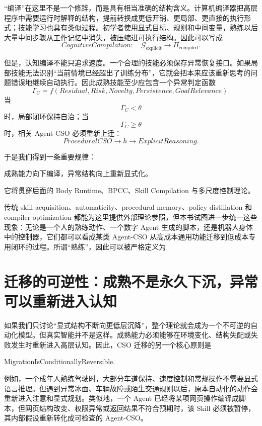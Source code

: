 “编译”在这里不是一个修辞，而是具有相当准确的结构含义。计算机编译器把高层程序中需要运行时解释的结构，提前转换成更低开销、更局部、更直接的执行形式；技能学习也具有类似过程。初学者使用显式目标、规则和中间变量，熟练以后大量中间步骤从工作记忆中消失，被压缩进可执行结构。因此可以写成
\[
CognitiveCompilation:
\quad
\mathcal G_{\mathrm{explicit}}
\rightarrow
\Pi_{\mathrm{compiled}}.
\]

但是，认知编译不能只追求速度。一个合理的技能必须保存异常恢复接口。如果局部技能无法识别“当前情境已经超出了训练分布”，它就会把本来应该重新思考的问题错误地继续自动执行。因此成熟技能至少应包含一个异常判定函数
\[
\Gamma_C
=
f(
Residual,
Risk,
Novelty,
Persistence,
GoalRelevance
).
\]
当
\[
\Gamma_C<\theta
\]
时，局部闭环保持自治；当
\[
\Gamma_C\geq\theta
\]
时，相关 Agent-CSO 必须重新上迁：
\[
ProceduralCSO
\rightarrow
h
\rightarrow
ExplicitReasoning.
\]

于是我们得到一条重要规律：
\begin{proposition*}
成熟能力向下编译，异常结构向上重新显式化。
\end{proposition*}
它将贯穿后面的 Body Runtime、BPCC、Skill Compilation 与多尺度控制理论。

传统 skill acquisition、automaticity、procedural memory、policy distillation 和 compiler optimization 都能为这里提供外部理论参照，但本书试图进一步统一这些现象：无论是一个人的熟练动作、一个数字 Agent 生成的脚本，还是机器人身体中的控制器，它们都可以看成某类 Agent-CSO 从高成本通用功能迁移到低成本专用闭环的过程。所谓“熟练”，因此可以被严格定义为
\begin{statementbox}
\centering
{}
\end{statementbox}


\section{迁移的可逆性：成熟不是永久下沉，异常可以重新进入认知}

如果我们只讨论“显式结构不断向更低层沉降”，整个理论就会成为一个不可逆的自动化模型。但真实智能并不是这样。成熟能力必须能够在环境变化、结构失配或失败发生时重新进入高层认知。因此，CSO 迁移的另一个核心原则是
\begin{statementbox}
MigrationIsConditionallyReversible.
\end{statementbox}

例如，一个成年人熟练驾驶时，大部分车道保持、速度控制和常规操作不需要显式语言推理。但遇到异常冰面、车辆故障或陌生交通规则以后，原本自动化的动作会重新进入注意和显式规划。类似地，一个 Agent 已经将某项网页操作编译成脚本，但网页结构改变、权限异常或返回结果不符合预期时，该 Skill 必须被暂停，其内部假设重新转化成可检查的 Agent-CSO。

